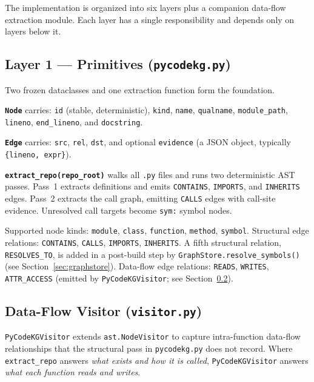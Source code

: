\documentclass[10pt]{article}
\begin{document}
The implementation is organized into six layers plus a companion data-flow
extraction module. Each layer has a single responsibility and depends only on
layers below it.

\subsection{Layer 1 --- Primitives (\texttt{pycodekg.py})}

Two frozen dataclasses and one extraction function form the foundation.

\textbf{\texttt{Node}} carries: \texttt{id} (stable, deterministic), \texttt{kind},
\texttt{name}, \texttt{qualname}, \texttt{module\_path}, \texttt{lineno},
\texttt{end\_lineno}, and \texttt{docstring}.

\textbf{\texttt{Edge}} carries: \texttt{src}, \texttt{rel}, \texttt{dst}, and
optional \texttt{evidence} (a JSON object, typically \texttt{\{lineno, expr\}}).

\textbf{\texttt{extract\_repo(repo\_root)}} walks all \texttt{.py} files and runs
two deterministic AST passes. Pass~1 extracts definitions and emits
\texttt{CONTAINS}, \texttt{IMPORTS}, and \texttt{INHERITS} edges. Pass~2 extracts
the call graph, emitting \texttt{CALLS} edges with call-site evidence. Unresolved
call targets become \texttt{sym:} symbol nodes.

Supported node kinds: \texttt{module}, \texttt{class}, \texttt{function},
\texttt{method}, \texttt{symbol}.
Structural edge relations: \texttt{CONTAINS}, \texttt{CALLS}, \texttt{IMPORTS},
\texttt{INHERITS}. A fifth structural relation, \texttt{RESOLVES\_TO}, is added
in a post-build step by \texttt{GraphStore.resolve\_symbols()} (see
Section~\ref{sec:graphstore}).
Data-flow edge relations: \texttt{READS}, \texttt{WRITES}, \texttt{ATTR\_ACCESS}
(emitted by \texttt{PyCodeKGVisitor}; see Section~\ref{sec:visitor}).

\subsection{Data-Flow Visitor (\texttt{visitor.py})}
\label{sec:visitor}

\texttt{PyCodeKGVisitor} extends \texttt{ast.NodeVisitor} to capture intra-function
data-flow relationships that the structural pass in \texttt{pycodekg.py} does not
record. Where \texttt{extract\_repo} answers \emph{what exists and how it is
called}, \texttt{PyCodeKGVisitor} answers \emph{what each function reads and writes}.
\end{document}
